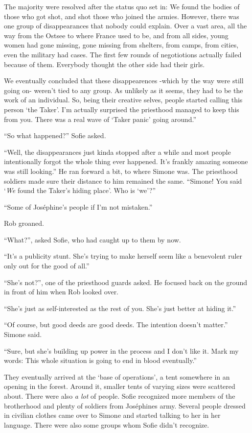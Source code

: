 \documentclass[letterpaper,12pt]{report}
\begin{document}
\nonopenquotation
The majority were resolved after the status quo set in: We found the bodies of those who got shot, and shot those who joined the armies. However, there was one group of disappearances that nobody could explain. Over a vast area, all the way from the Ostsee to where France used to be, and from all sides, young women had gone missing, gone missing from shelters, from camps, from cities, even the military had cases. The first few rounds of negotiotions actually failed because of them. Everybody thought the other side had their girls.

\nonopenquotation
We eventually concluded that these disappearences -which by the way were still going on- weren't tied to any group. As unlikely as it seems, they had to be the work of an individual. So, being their creative selves, people started calling this person `the Taker'. I'm actually surprised the priesthood managed to keep this from you. There was a real wave of `Taker panic' going around.''

``So what happened?'' Sofie asked.

``Well, the disappearances just kinda stopped after a while and most people intentionally forgot the whole thing ever happened. It's frankly amazing someone was still looking.'' He ran forward a bit, to where Simone was. The priesthood soldiers made sure their distance to him remained the same. ``Simone! You said `\textit{We} found the Taker's hiding place'. Who is `we'?''

``Some of Jos\'ephine's people if I'm not mistaken.''

Rob groaned.

``What?'', asked Sofie, who had caught up to them by now.

``It's a publicity stunt. She's trying to make herself seem like a benevolent ruler only out for the good of all.''

``She's not?'', one of the priesthood guards asked. He focused back on the ground in front of him when Rob looked over.

``She's just as self-interested as the rest of you. She's just better at hiding it.''

``Of course, but good deeds are good deeds. The intention doesn't matter.'' Simone said.

``Sure, but she's building up power in the process and I don't like it. Mark my words: This whole situation is going to end in blood eventually.''
\act

They eventually arrived at the `base of operations', a tent somewhere in an opening in the forest. Around it, smaller tents of varying sizes were scattered about. There were also \textit{a lot} of people. Sofie recognized more members of the brotherhood and plenty of soldiers from Jos\'ephines army. Several people dressed in civilian clothes came over to Simone and started talking to her in her language. There were also some groups whom Sofie didn't recognize.
\end{document}
